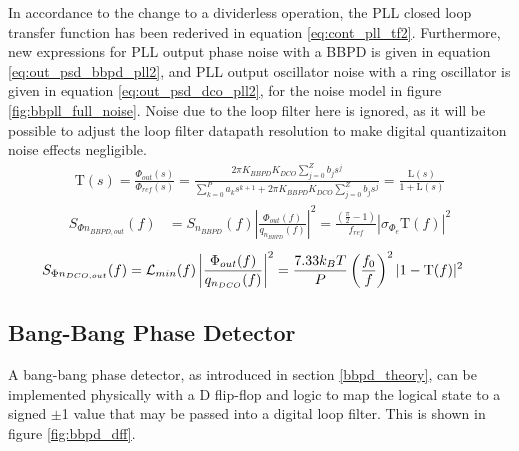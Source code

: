   In accordance to the change to a dividerless operation, the PLL closed loop transfer function has been rederived in equation \ref{eq:cont_pll_tf2}. Furthermore, new expressions for PLL output phase noise with a BBPD is given in equation \ref{eq:out_psd_bbpd_pll2}, and PLL output oscillator noise with a ring oscillator is given in equation \ref{eq:out_psd_dco_pll2}, for the noise model in figure \ref{fig:bbpll_full_noise}. Noise due to the loop filter here is ignored, as it will be possible to adjust the loop filter datapath resolution to make digital quantizaiton noise effects negligible.
		\begin{align} \label{eq:cont_pll_tf2}
			\mathrm{T}(s) = \frac{\Phi_{out}(s)}{\Phi_{ref}(s)} = \frac{2\pi K_{BBPD}K_{DCO}\sum_{j=0}^Z b_js^j}{\sum_{k=0}^P a_ks^{k+1} + 2\pi K_{BBPD}K_{DCO}\sum_{j=0}^Z b_js^j} = \frac{\mathrm{L}(s)}{1 + \mathrm{L}(s)}
		\end{align}
		\begin{align}\label{eq:out_psd_bbpd_pll2}
			S_{\Phi n_{BBPD,out}}(f) &= S_{n_{BBPD}}(f)\left|\frac{\Phi_{out}(f)}{q_{n_{BBPD}}(f)}\right|^2 = \frac{\left(\frac{\pi}{2}-1\right)}{f_{ref}}\left|\sigma_{\Phi_e}\mathrm{T}(f)\right|^2
		\end{align}
		\begin{align}\label{eq:out_psd_dco_pll2}
			S_{\Phi n_{DCO,out}}(f) &= \mathcal{L}_{min}(f)\left|\frac{\Phi_{out}(f)}{q_{n_{DCO}}(f)}\right|^2 = \frac{7.33k_BT}{P}\left(\frac{f_0}{f}\right)^2|1-\textnormal{T}(f)|^2 
		\end{align}


	\subsection{Bang-Bang Phase Detector}
		A bang-bang phase detector, as introduced in section \ref{bbpd_theory}, can be implemented physically with a D flip-flop \cite{Razavi2020} and logic to map the logical state to a signed $\pm$1 value that may be passed into a digital loop filter. This is shown in figure \ref{fig:bbpd_dff}. 

